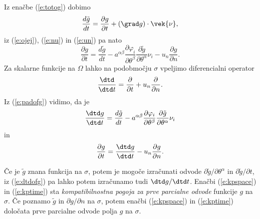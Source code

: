 Iz enačbe (\ref{e:totog}) dobimo
\[ \frac{d\tilde{g}}{dt}=\frac{\partial g}{\partial t}+(\grad g)\cdot\vek{\nu}, \]
iz (\ref{e:ojej}), (\ref{e:nu}) in (\ref{e:un}) pa nato
\begin{equation} \label{e:padofg}
	\frac{\partial g}{\partial t}=\frac{d\tilde{g}}{dt}-
	a^{\alpha\beta}\frac{\partial\varphi_i}{\partial\theta^{\beta}}
 \frac{\partial \tilde{g}}{\partial\theta^{\alpha}}\nu_i-
	u_n\frac{\partial g}{\partial n}.
\end{equation}
Za skalarne funkcije na $\Omega$ lahko na podobmočju $\sigma$ vpeljimo diferencialni operator
\[ \frac{\dtd}{\dtd t}=\frac{\partial}{\partial t}+u_n\frac{\partial}{\partial n}. \]
Iz (\ref{e:padofg}) vidimo, da je
\begin{equation} \label{e:dtdofg}
	\frac{\dtd g}{\dtd t}=\frac{d\tilde{g}}{d t}-
	a^{\alpha\beta}\frac{\partial\varphi_i}{\partial\theta^{\beta}}
	\frac{\partial \tilde{g}}{\partial\theta^{\alpha}}\nu_i
\end{equation}
in
\begin{equation} \label{e:kptime}
	\frac{\partial g}{\partial t}=\frac{\dtd g}{\dtd t}-u_n\frac{\partial g}{\partial n}.
\end{equation}

Če je $\tilde{g}$ znana funkcija na $\sigma$, potem je mogoče izračunati odvode
$\partial\tilde{g}/\partial\theta^{\alpha}$ in $\partial\tilde{g}/\partial t$,
iz (\ref{e:dtdofg}) pa lahko potem izračunamo tudi $\dtd g/\dtd t$.
Enačbi (\ref{e:kpspace}) in (\ref{e:kptime}) sta \emph{kompatibilnostna pogoja za prve parcialne odvode}
funkcije $g$ na $\sigma$.
Če poznamo $\tilde{g}$ in $\partial g/\partial n$ na $\sigma$, potem enačbi
(\ref{e:kpspace}) in (\ref{e:kptime}) določata prve parcialne odvode polja $g$ na $\sigma$.

